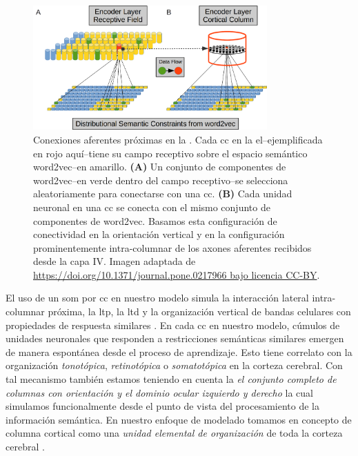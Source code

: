 {\begin{figure}[ht!]
    \centering
    \includegraphics[width=0.8\textwidth]{EncoderProximalConnections1.png}
    \caption{Conexiones aferentes próximas en la . Cada \gls{cc} en la \gls{el}--ejemplificada en rojo aquí--tiene su campo receptivo sobre el espacio semántico word2vec--en amarillo.
    \textbf{(A)} Un conjunto de componentes de word2vec--en verde dentro del campo receptivo--se selecciona aleatoriamente para conectarse con una \gls{cc}.
    \textbf{(B)} Cada unidad neuronal en una \gls{cc} se conecta con el mismo conjunto de componentes de word2vec. Basamos esta configuración de conectividad en la orientación vertical y en la configuración prominentemente intra-columnar de los axones aferentes recibidos desde la capa IV.
    Imagen adaptada de \url{https://doi.org/10.1371/journal.pone.0217966 bajo licencia CC-BY}.}
    \label{fig:EncoderProximalConnections1}
\end{figure}

El uso de un \gls{som} por \gls{cc} en nuestro modelo simula la interacción lateral intra-columnar próxima, la \gls{ltp}, la \gls{ltd} y la organización vertical de bandas celulares con propiedades de respuesta similares \cite{mountcastle_1955,Haueis2016}.
En cada \gls{cc} en nuestro modelo, cúmulos de unidades neuronales que responden a restricciones semánticas similares emergen de manera espontánea desde el proceso de aprendizaje.
Esto tiene correlato con la organización \emph{tonotópica}, \emph{retinotópica} o \emph{somatotópica} en la corteza cerebral.
Con tal mecanismo también estamos teniendo en cuenta la \emph{el conjunto completo de columnas con orientación y el dominio ocular izquierdo y derecho} \cite{doi:10.1002/cne.901580305} la cual simulamos funcionalmente desde el punto de vista del procesamiento de la información semántica.
En nuestro enfoque de modelado tomamos en concepto de columna cortical como una \emph{unidad elemental de organización} de toda la corteza cerebral \cite{doi:10.1152/jn.1957.20.4.408,Mountcastle1978AnOP,10.1093/brain/120.4.701}. 


}
